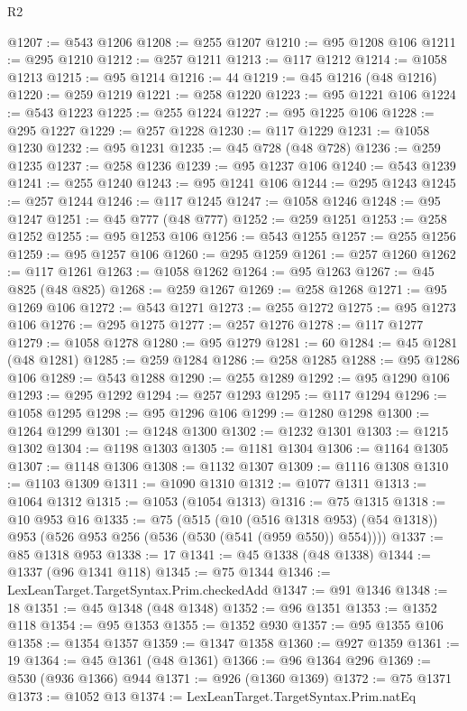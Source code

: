 \begin{lexlean}{R2}
\begin{coremodule}
@1207 := @543 @1206
@1208 := @255 @1207
@1210 := @95 @1208 @106
@1211 := @295 @1210
@1212 := @257 @1211
@1213 := @117 @1212
@1214 := @1058 @1213
@1215 := @95 @1214
@1216 := 44
@1219 := @45 @1216 (@48 @1216)
@1220 := @259 @1219
@1221 := @258 @1220
@1223 := @95 @1221 @106
@1224 := @543 @1223
@1225 := @255 @1224
@1227 := @95 @1225 @106
@1228 := @295 @1227
@1229 := @257 @1228
@1230 := @117 @1229
@1231 := @1058 @1230
@1232 := @95 @1231
@1235 := @45 @728 (@48 @728)
@1236 := @259 @1235
@1237 := @258 @1236
@1239 := @95 @1237 @106
@1240 := @543 @1239
@1241 := @255 @1240
@1243 := @95 @1241 @106
@1244 := @295 @1243
@1245 := @257 @1244
@1246 := @117 @1245
@1247 := @1058 @1246
@1248 := @95 @1247
@1251 := @45 @777 (@48 @777)
@1252 := @259 @1251
@1253 := @258 @1252
@1255 := @95 @1253 @106
@1256 := @543 @1255
@1257 := @255 @1256
@1259 := @95 @1257 @106
@1260 := @295 @1259
@1261 := @257 @1260
@1262 := @117 @1261
@1263 := @1058 @1262
@1264 := @95 @1263
@1267 := @45 @825 (@48 @825)
@1268 := @259 @1267
@1269 := @258 @1268
@1271 := @95 @1269 @106
@1272 := @543 @1271
@1273 := @255 @1272
@1275 := @95 @1273 @106
@1276 := @295 @1275
@1277 := @257 @1276
@1278 := @117 @1277
@1279 := @1058 @1278
@1280 := @95 @1279
@1281 := 60
@1284 := @45 @1281 (@48 @1281)
@1285 := @259 @1284
@1286 := @258 @1285
@1288 := @95 @1286 @106
@1289 := @543 @1288
@1290 := @255 @1289
@1292 := @95 @1290 @106
@1293 := @295 @1292
@1294 := @257 @1293
@1295 := @117 @1294
@1296 := @1058 @1295
@1298 := @95 @1296 @106
@1299 := @1280 @1298
@1300 := @1264 @1299
@1301 := @1248 @1300
@1302 := @1232 @1301
@1303 := @1215 @1302
@1304 := @1198 @1303
@1305 := @1181 @1304
@1306 := @1164 @1305
@1307 := @1148 @1306
@1308 := @1132 @1307
@1309 := @1116 @1308
@1310 := @1103 @1309
@1311 := @1090 @1310
@1312 := @1077 @1311
@1313 := @1064 @1312
@1315 := @1053 (@1054 @1313)
@1316 := @75 @1315
@1318 := @10 @953 @16
@1335 := @75
    (@515
      (@10 (@516 @1318 @953) (@54 @1318))
      @953
      (@526 @953 @256 (@536 (@530 (@541 (@959 @550)) @554))))
@1337 := @85 @1318 @953
@1338 := 17
@1341 := @45 @1338 (@48 @1338)
@1344 := @1337 (@96 @1341 @118)
@1345 := @75 @1344
@1346 := LexLeanTarget.TargetSyntax.Prim.checkedAdd
@1347 := @91 @1346
@1348 := 18
@1351 := @45 @1348 (@48 @1348)
@1352 := @96 @1351
@1353 := @1352 @118
@1354 := @95 @1353
@1355 := @1352 @930
@1357 := @95 @1355 @106
@1358 := @1354 @1357
@1359 := @1347 @1358
@1360 := @927 @1359
@1361 := 19
@1364 := @45 @1361 (@48 @1361)
@1366 := @96 @1364 @296
@1369 := @530 (@936 @1366) @944
@1371 := @926 (@1360 @1369)
@1372 := @75 @1371
@1373 := @1052 @13
@1374 := LexLeanTarget.TargetSyntax.Prim.natEq

\end{coremodule}
\end{lexlean}
